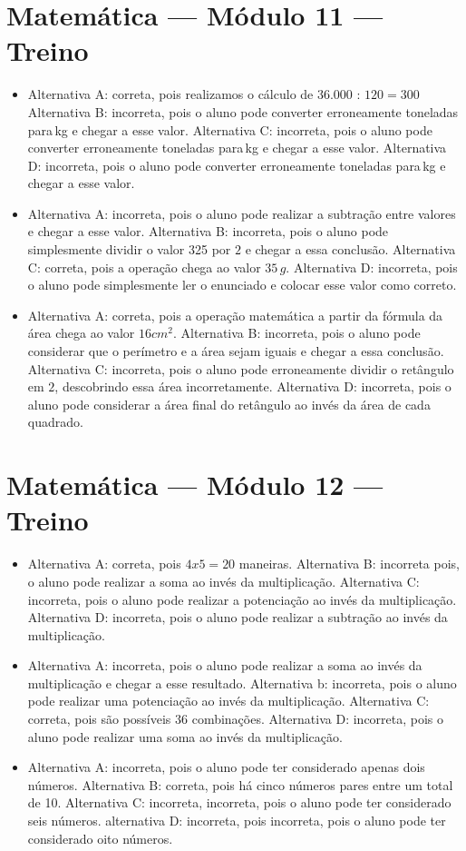 \section*{Matemática — Módulo 11 — Treino}

\begin{itemize}

\item Alternativa A: correta, pois realizamos o cálculo de $36.000$ : $120 = 300$
Alternativa B: incorreta, pois o aluno pode converter erroneamente
toneladas para\,kg e chegar a esse valor.
Alternativa C: incorreta, pois o aluno pode converter erroneamente
toneladas para\,kg e chegar a esse valor.
Alternativa D: incorreta, pois o aluno pode converter erroneamente
toneladas para\,kg e chegar a esse valor.
\item Alternativa A: incorreta, pois o aluno pode realizar a subtração entre
valores e chegar a esse valor.
Alternativa B: incorreta, pois o aluno pode simplesmente dividir o valor
325 por $2$ e chegar a essa conclusão.
Alternativa C: correta, pois a operação chega ao valor $35\,g$.
Alternativa D: incorreta, pois o aluno pode simplesmente ler o enunciado
e colocar esse valor como correto.
\item Alternativa A: correta, pois a operação matemática a partir da fórmula
da área chega ao valor $16cm^2$.
Alternativa B: incorreta, pois o aluno pode considerar que o perímetro e
a área sejam iguais e chegar a essa conclusão.
Alternativa C: incorreta, pois o aluno pode erroneamente dividir o
retângulo em $2$, descobrindo essa área incorretamente.
Alternativa D: incorreta, pois o aluno pode considerar a área final do
retângulo ao invés da área de cada quadrado.
\end{itemize}

\section*{Matemática — Módulo 12 — Treino}

\begin{itemize}
\item Alternativa A: correta, pois $4 x 5 = 20$ maneiras.
Alternativa B: incorreta pois, o aluno pode realizar a soma ao invés da
multiplicação.
Alternativa C: incorreta, pois o aluno pode realizar a potenciação ao
invés da multiplicação.
Alternativa D: incorreta, pois o aluno pode realizar a subtração ao
invés da multiplicação.
\item Alternativa A: incorreta, pois o aluno pode realizar a soma ao invés da
multiplicação e chegar a esse resultado.
Alternativa b: incorreta, pois o aluno pode realizar uma potenciação ao
invés da multiplicação. 
Alternativa C: correta, pois são possíveis $36$ combinações.
Alternativa D: incorreta, pois o aluno pode realizar uma soma ao invés
da multiplicação.
\item Alternativa A: incorreta, pois o aluno pode ter considerado apenas dois
números.
Alternativa B: correta, pois há cinco números pares entre um total de
10.
Alternativa C: incorreta, incorreta, pois o aluno pode ter considerado
seis números.
alternativa D: incorreta, pois incorreta, pois o aluno pode ter
considerado oito números.
\end{itemize}

